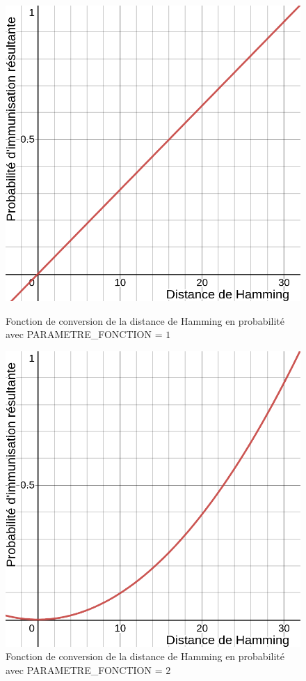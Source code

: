 \begin{figure}[h]
  \centering
    \captionsetup{justification=centering}
  \begin{minipage}[b]{0.4\textwidth}
    \includegraphics[width=\textwidth]{Images/fonction_1.png}
    \caption[Fonction de converstion en probabilité (facteur 1)]{Fonction de conversion de la distance de Hamming en probabilité avec {\small PARAMETRE\_FONCTION} = $1$}
  \end{minipage}
  \hfill
  \begin{minipage}[b]{0.4\textwidth}
    \includegraphics[width=\textwidth]{Images/fonction_2.png}
    \caption[Fonction de converstion en probabilité (facteur 2)]{Fonction de conversion de la distance de Hamming en probabilité avec {\small PARAMETRE\_FONCTION} = $2$}
  \end{minipage}
\end{figure}

